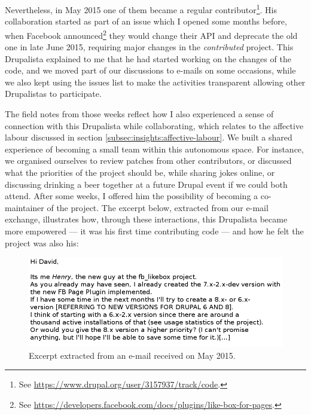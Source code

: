 Nevertheless, in May 2015 one of them became a regular contributor\footnote{See \url{https://www.drupal.org/user/3157937/track/code}.}. His collaboration started as part of an issue which I opened some months before, when Facebook announced\footnote{See \url{https://developers.facebook.com/docs/plugins/like-box-for-pages}.} they would change their API and deprecate the old one in late June 2015, requiring major changes in the \textit{contributed} project. This Drupalista explained to me that he had started working on the changes of the code, and we moved part of our discussions to e-mails on some occasions, while we also kept using the issues list to make the activities transparent allowing other Drupalistas to participate.

The field notes from those weeks reflect how I also experienced a sense of connection with this Drupalista while collaborating, which relates to the affective labour discussed in section \ref{subsec:insights:affective-labour}. We built a shared experience of becoming a small team within this autonomous space. For instance, we organised ourselves to review patches from other contributors, or discussed what the priorities of the project should be, while sharing jokes online, or discussing drinking a beer together at a future Drupal event if we could both attend. After some weeks, I offered him the possibility of becoming a co-maintainer of the project. The excerpt below, extracted from our e-mail exchange, illustrates how, through these interactions, this Drupalista became more empowered --- it was his first time contributing code --- and how he felt the project was also his:

\begin{figure}[H]
    \centering
 \includegraphics[scale=0.5]{img/quotes_replacement/quote_henry_email.png}
  \caption[Excerpt extracted from an e-mail sent by \textit{Henry}]{Excerpt extracted from an e-mail received on  May 2015.}
   \label{quote_henry_email}
\end{figure}

